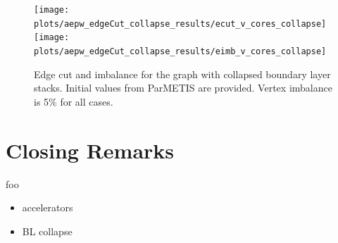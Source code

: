 \documentclass[conference]{IEEEtran}
\begin{document}
\begin{figure}[!ht]
  \centering
  \texttt{[image: plots/aepw\_edgeCut\_collapse\_results/ecut\_v\_cores\_collapse]}
  \texttt{[image: plots/aepw\_edgeCut\_collapse\_results/eimb\_v\_cores\_collapse]}
  \caption{Edge cut and imbalance for the graph with collapsed boundary layer stacks. Initial values from ParMETIS are provided. Vertex imbalance is 5\% for all cases.}
  \label{fig:collapse}
\end{figure}

\section{Closing Remarks}
foo

\begin{itemize}
\item accelerators
\item BL collapse
\end{itemize}



\end{document}
